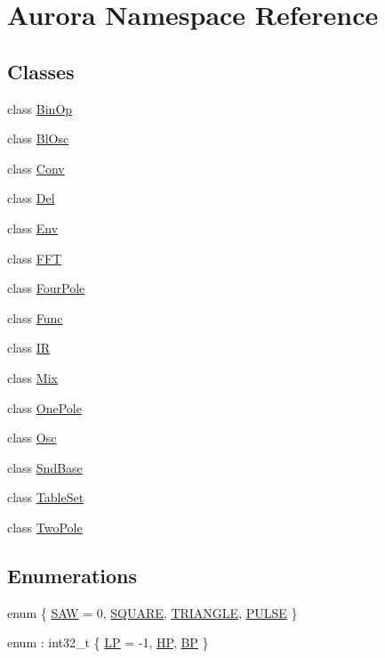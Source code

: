 \hypertarget{namespace_aurora}{}\section{Aurora Namespace Reference}
\label{namespace_aurora}
\subsection*{Classes}
\begin{DoxyCompactItemize}
\item 
class \hyperlink{class_aurora_1_1_bin_op}{Bin\+Op}
\item 
class \hyperlink{class_aurora_1_1_bl_osc}{Bl\+Osc}
\item 
class \hyperlink{class_aurora_1_1_conv}{Conv}
\item 
class \hyperlink{class_aurora_1_1_del}{Del}
\item 
class \hyperlink{class_aurora_1_1_env}{Env}
\item 
class \hyperlink{class_aurora_1_1_f_f_t}{F\+FT}
\item 
class \hyperlink{class_aurora_1_1_four_pole}{Four\+Pole}
\item 
class \hyperlink{class_aurora_1_1_func}{Func}
\item 
class \hyperlink{class_aurora_1_1_i_r}{IR}
\item 
class \hyperlink{class_aurora_1_1_mix}{Mix}
\item 
class \hyperlink{class_aurora_1_1_one_pole}{One\+Pole}
\item 
class \hyperlink{class_aurora_1_1_osc}{Osc}
\item 
class \hyperlink{class_aurora_1_1_snd_base}{Snd\+Base}
\item 
class \hyperlink{class_aurora_1_1_table_set}{Table\+Set}
\item 
class \hyperlink{class_aurora_1_1_two_pole}{Two\+Pole}
\end{DoxyCompactItemize}
\subsection*{Enumerations}
\begin{DoxyCompactItemize}
\item 
enum \{ \hyperlink{namespace_aurora_a890b8d3786c8a25750e8097adae3b513ad47a607309b6d737bba699a295e5e814}{S\+AW} = 0, 
\hyperlink{namespace_aurora_a890b8d3786c8a25750e8097adae3b513ad12f117b00f964cb4de3809ca2e2fa2b}{S\+Q\+U\+A\+RE}, 
\hyperlink{namespace_aurora_a890b8d3786c8a25750e8097adae3b513a0c9e1e4fb03cbc79bb5fdd9db743818f}{T\+R\+I\+A\+N\+G\+LE}, 
\hyperlink{namespace_aurora_a890b8d3786c8a25750e8097adae3b513aa52ebfb9f31c0d7f0da3f2f66b622928}{P\+U\+L\+SE}
 \}
\item 
enum \+: int32\+\_\+t \{ \hyperlink{namespace_aurora_a963f359f40fdbc5f4dbe4043534de9ebaa9f81f17c7244e2198dba962e817cf89}{LP} = -\/1, 
\hyperlink{namespace_aurora_a963f359f40fdbc5f4dbe4043534de9eba404a7e9d666dc8dc6a9492163a8f3d49}{HP}, 
\hyperlink{namespace_aurora_a963f359f40fdbc5f4dbe4043534de9ebae818fb1792095c52b12163ec152896c8}{BP}
 \}
\end{DoxyCompactItemize}

